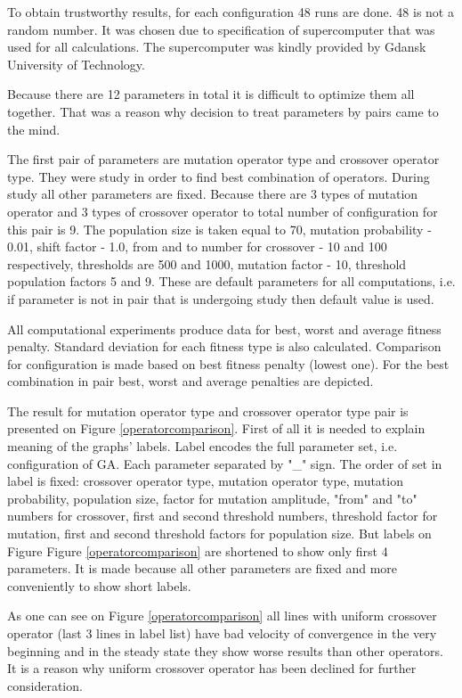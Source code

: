 \documentclass[12pt]{report}
\begin{document}
To obtain trustworthy results, for each configuration 48 runs are done. 48 is not a random number. It was chosen due to specification of supercomputer that was used for all calculations. The supercomputer was kindly provided by Gdansk University of Technology.

Because there are 12 parameters in total it is difficult to optimize them all together. That was a reason why decision to treat parameters by pairs came to the mind. 

The first pair of parameters are mutation operator type and crossover operator type. They were study in order to find best combination of operators. During study all other parameters are fixed. Because there are 3 types of mutation operator and 3 types of crossover operator to total number of configuration for this pair is 9. The population size is taken equal to 70, mutation probability - 0.01, shift factor - 1.0, from and to number for crossover - 10 and 100 respectively, thresholds are 500 and 1000, mutation factor - 10, threshold population factors 5 and 9. These are default parameters for all computations, i.e. if parameter is not in pair that is undergoing study then default value is used.

All computational experiments produce data for best, worst and average fitness penalty. Standard deviation for each fitness type is also calculated. Comparison for configuration is made based on best fitness penalty (lowest one). For the best combination in pair best, worst and average penalties are depicted.

The result for mutation operator type and crossover operator type pair is presented on Figure \ref{operatorcomparison}. First of all it is needed to explain meaning of the graphs' labels. Label encodes the full parameter set, i.e. configuration of GA. Each parameter separated by "\_" sign. The order of set in label is fixed: crossover operator type, mutation operator type, mutation probability, population size, factor for mutation amplitude, "from" and "to" numbers for crossover, first and second threshold numbers, threshold factor for mutation, first and second threshold factors for population size. But labels on Figure Figure \ref{operatorcomparison} are shortened to show only first 4 parameters. It is made because all other parameters are fixed and more conveniently to show short labels.

As one can see on Figure \ref{operatorcomparison} all lines with uniform crossover operator (last 3 lines in label list) have bad velocity of convergence in the very beginning and in the steady state they show worse results than other operators. It is a reason why uniform crossover operator has been declined for further consideration.
\end{document}
